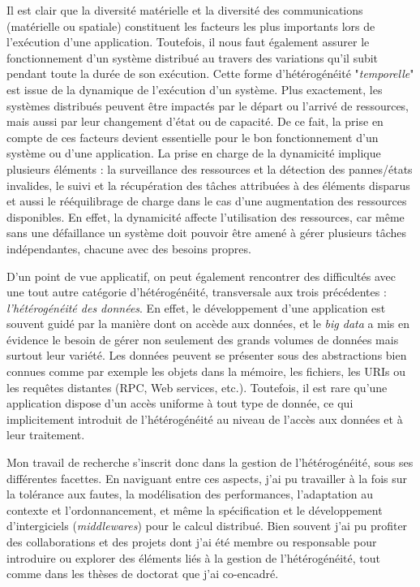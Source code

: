 Il est clair que la diversité matérielle et la diversité des communications (matérielle ou spatiale) constituent les facteurs les plus importants lors de l'exécution d'une application. Toutefois, il nous faut également assurer le fonctionnement d'un système distribué au travers des variations qu'il subit pendant toute la durée de son exécution. Cette forme d'hétérogénéité "\textit{temporelle}" est issue de la dynamique de l'exécution d'un système. Plus exactement, les systèmes distribués peuvent être impactés par le départ ou l'arrivé de ressources, mais aussi par leur changement d'état ou de capacité. De ce fait, la prise en compte de ces facteurs devient essentielle pour le bon fonctionnement d'un système ou d'une application. La prise en charge de la dynamicité implique plusieurs éléments : la surveillance des ressources et la détection des pannes/états invalides, le suivi et la récupération des tâches attribuées à des éléments disparus et aussi le rééquilibrage de charge dans le cas d'une augmentation des ressources disponibles. En effet, la dynamicité affecte l'utilisation des ressources, car même sans une défaillance un système doit pouvoir être amené à gérer plusieurs tâches indépendantes, chacune avec des besoins propres.

D'un point de vue applicatif, on peut également rencontrer des difficultés avec une tout autre catégorie d'hétérogénéité, transversale aux trois précédentes :\textit{ l'hétérogénéité des données}. En effet, le développement d'une application est souvent guidé par la manière dont on accède aux données, et le \textit{big data} a mis en évidence le besoin de gérer non seulement des grands volumes de données mais surtout leur variété. Les données peuvent se présenter sous des abstractions bien connues comme par exemple les objets dans la mémoire, les fichiers, les URIs ou les requêtes distantes (RPC, Web services, etc.). Toutefois, il est rare qu'une application dispose d'un accès uniforme à tout type de donnée, ce qui implicitement introduit de l'hétérogénéité au niveau de l'accès aux données et à leur traitement. 

Mon travail de recherche s'inscrit donc dans la gestion de l'hétérogénéité, sous ses différentes facettes. En naviguant entre ces aspects, j'ai pu travailler à la fois sur la tolérance aux fautes, la modélisation des performances, l'adaptation au contexte et l'ordonnancement, et même la spécification et le développement d'intergiciels (\textit{middlewares}) pour le calcul distribué. Bien souvent j'ai pu profiter des collaborations et des projets dont j'ai été membre ou responsable pour introduire ou explorer des éléments liés à la gestion de l'hétérogénéité, tout comme dans les thèses de doctorat que j'ai co-encadré. 

